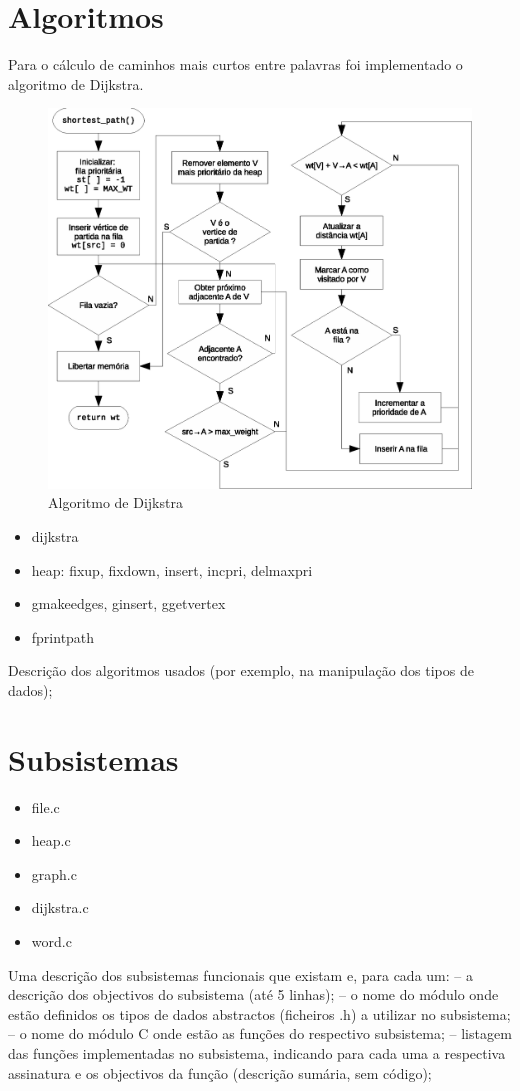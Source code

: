\documentclass[a4paper, 18pt]{article}
\newcommand\tu[0]{\textunderscore}
\begin{document}
\section{Algoritmos}
	Para o cálculo de caminhos mais curtos entre palavras foi implementado o algoritmo de Dijkstra.
	\begin{figure}[H]
		\centering
		\includegraphics[width=\linewidth]{dijkstra}
		\caption{Algoritmo de Dijkstra}
	\end{figure}

	\begin{itemize}
		\item dijkstra
		\item heap: fixup, fixdown, insert, incpri, delmaxpri
		\item g\tu make\tu edges, g\tu insert, g\tu get\tu vertex
		\item fprint\tu path
	\end{itemize}
	\par
	Descrição dos algoritmos usados (por exemplo, na manipulação dos tipos de dados);

\section{Subsistemas}
	\begin{itemize}
		\item file.c
		\item heap.c
		\item graph.c
		\item dijkstra.c
		\item word.c
	\end{itemize}
	\par
	Uma descrição dos subsistemas funcionais que existam e, para cada um:
	– a descrição dos objectivos do subsistema (até 5 linhas);
	– o nome do módulo onde estão definidos os tipos de dados abstractos
	  (ficheiros .h) a utilizar no subsistema;
	– o nome do módulo C onde estão as funções do respectivo subsistema;
	– listagem das funções implementadas no subsistema, indicando para cada uma a
	  respectiva assinatura e os objectivos da função (descrição sumária, sem código);
\end{document}
